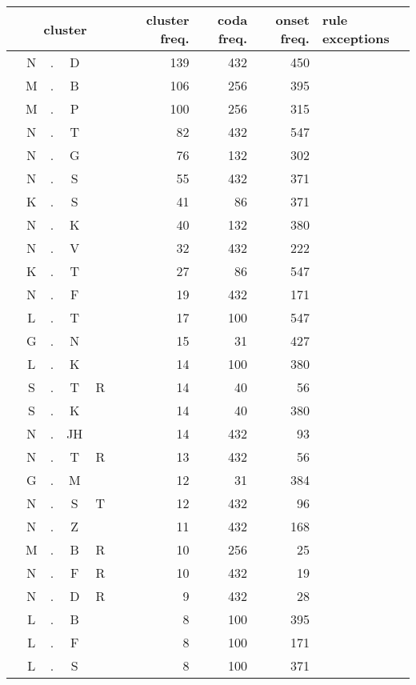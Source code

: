 
\begin{center}
\begin{longtable}{c@{ } c@{ } c@{ } c@{ } c@{ } c@{ } r r r l }
\toprule
\multicolumn{6}{c}{cluster} & cluster freq. & coda freq. & onset freq. & rule exceptions \\
\midrule
  & N  & . & D  &   &   & 139 & 432 & 450 &  \\ 
  & M  & . & B  &   &   & 106 & 256 & 395 &  \\ 
  & M  & . & P  &   &   & 100 & 256 & 315 &  \\ 
  & N  & . & T  &   &   & 82 & 432 & 547 &  \\ 
  & N  & . & G  &   &   & 76 & 132 & 302 &  \\ 
  & N  & . & S  &   &   & 55 & 432 & 371 &  \\ 
  & K  & . & S  &   &   & 41 & 86 & 371 &  \\ 
  & N  & . & K  &   &   & 40 & 132 & 380 &  \\ 
  & N  & . & V  &   &   & 32 & 432 & 222 &  \\ 
  & K  & . & T  &   &   & 27 & 86 & 547 &  \\ 
  & N  & . & F  &   &   & 19 & 432 & 171 &  \\ 
  & L  & . & T  &   &   & 17 & 100 & 547 &  \\ 
  & G  & . & N  &   &   & 15 & 31 & 427 &  \\ 
  & L  & . & K  &   &   & 14 & 100 & 380 &  \\ 
  & S  & . & T  & R &   & 14 & 40 & 56 &  \\ 
  & S  & . & K  &   &   & 14 & 40 & 380 &  \\ 
  & N  & . & JH &   &   & 14 & 432 & 93 &  \\ 
  & N  & . & T  & R &   & 13 & 432 & 56 &  \\ 
  & G  & . & M  &   &   & 12 & 31 & 384 &  \\ 
  & N  & . & S  & T &   & 12 & 432 & 96 &  \\ 
  & N  & . & Z  &   &   & 11 & 432 & 168 &  \\ 
  & M  & . & B  & R &   & 10 & 256 & 25 &  \\ 
  & N  & . & F  & R &   & 10 & 432 & 19 &  \\ 
  & N  & . & D  & R &   & 9 & 432 & 28 &  \\ 
  & L  & . & B  &   &   & 8 & 100 & 395 &  \\ 
  & L  & . & F  &   &   & 8 & 100 & 171 &  \\ 
  & L  & . & S  &   &   & 8 & 100 & 371 &  \\ 

\end{longtable}
\end{center}

